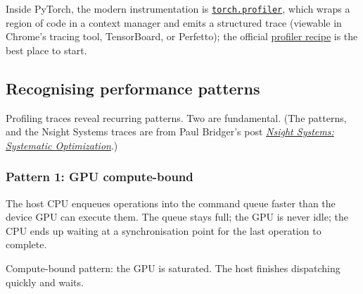 \documentclass[11pt,a4paper]{article}
\theoremstyle{definition}
\theoremstyle{remark}
\theoremstyle{plain}
\begin{document}
Inside PyTorch, the modern instrumentation is
\href{https://pytorch.org/docs/stable/profiler.html\#module-torch.profiler}{\texttt{torch.profiler}},
which wraps a region of code in a context manager and emits a structured
trace (viewable in Chrome's tracing tool, TensorBoard, or Perfetto); the
official
\href{https://pytorch.org/tutorials/recipes/recipes/profiler_recipe.html}{profiler
recipe} is the best place to start.

\subsection{Recognising performance patterns}

Profiling traces reveal recurring patterns. Two are fundamental. (The
patterns, and the Nsight Systems traces are from Paul Bridger's post
\href{https://paulbridger.com/posts/nsight-systems-systematic-optimization/}{\textit{Nsight
Systems: Systematic Optimization}}.)

\subsubsection*{Pattern 1: GPU compute-bound}

The host CPU enqueues operations into the command queue faster than the
device GPU can execute them. The queue stays full; the GPU is never idle;
the CPU ends up waiting at a synchronisation point for the last operation
to complete.

\begin{center}
\par\smallskip
{\small Compute-bound pattern: the GPU is saturated. The host finishes
dispatching quickly and waits.}
\end{center}
\end{document}
